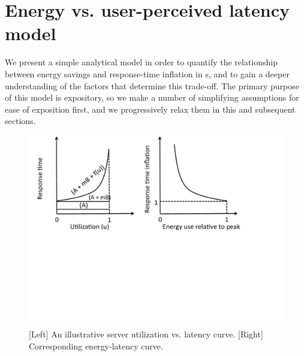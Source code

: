 \section{Energy vs. user-perceived latency model}
\label{sec:analysis}

We present a simple analytical model in order to quantify the relationship between energy savings and response-time inflation in \cdc s, and to gain a deeper understanding of the factors that determine this trade-off. The primary purpose of this model is expository, so we make a number of simplifying assumptions for ease of exposition first, and we progressively relax them in this and subsequent sections.



\begin{figure}
\centering
\includegraphics[scale=0.36]{figures/model.pdf}
\vspace{-1.5in}
\caption{[Left] An illustrative server utilization vs. latency curve. [Right] Corresponding energy-latency curve.}
\label{fig:model}
\end{figure}

